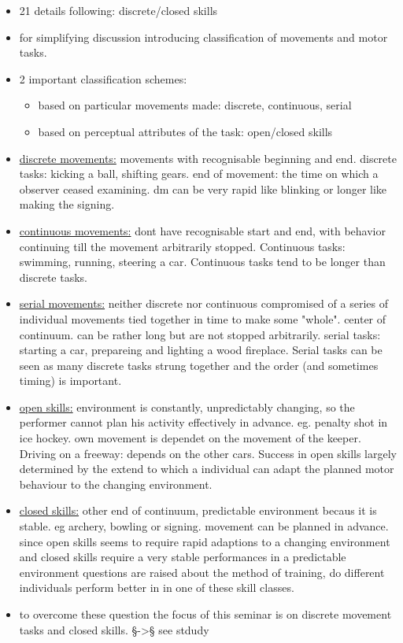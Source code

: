 	\begin{itemize}
		\item 21 details following: discrete/closed skills
		\item for simplifying discussion introducing classification of movements and motor tasks.
		\item 2 important classification schemes:
		\begin{itemize}
			\item based on particular movements made: discrete, continuous, serial
			\item based on perceptual attributes of the task: open/closed skills
		\end{itemize}
		\item \underline{discrete movements:} movements with recognisable beginning and end. discrete tasks: kicking a ball, shifting gears. end of movement: the time on which a observer ceased examining. dm can be very rapid like blinking or longer like making the signing.
		\item \underline{continuous movements:} dont have recognisable start and end, with behavior continuing till the movement arbitrarily stopped. Continuous tasks: swimming, running, steering a car. Continuous tasks tend to be longer than discrete tasks.
		\item \underline{serial movements:} neither discrete nor continuous compromised of a series of individual movements tied together in time to make some "whole". center of continuum. can be rather long but are not stopped arbitrarily. serial tasks: starting a car, prepareing and lighting a wood fireplace. Serial tasks can be seen as many discrete tasks strung together and the order (and sometimes timing) is important.
		\item \underline{open skills:} environment is constantly, unpredictably changing, so the performer cannot plan his activity effectively in advance. eg. penalty shot in ice hockey. own movement is dependet on the movement of the keeper. Driving on a freeway: depends on the other cars. Success in open skills largely determined by the extend to which a individual can adapt the planned motor behaviour to the changing environment.
		\item \underline{closed skills:} other end of continuum, predictable environment becaus it is stable. eg archery, bowling or signing. movement can be planned in advance.
		since open skills  seems to require rapid adaptions to a changing environment and closed skills require a very stable performances in a predictable environment questions are raised about the method of training, do different individuals perform better in in one of these skill classes. 
		\item to overcome these question the focus of this seminar is on discrete movement tasks and closed skills. §->§ see stdudy
	\end{itemize}
